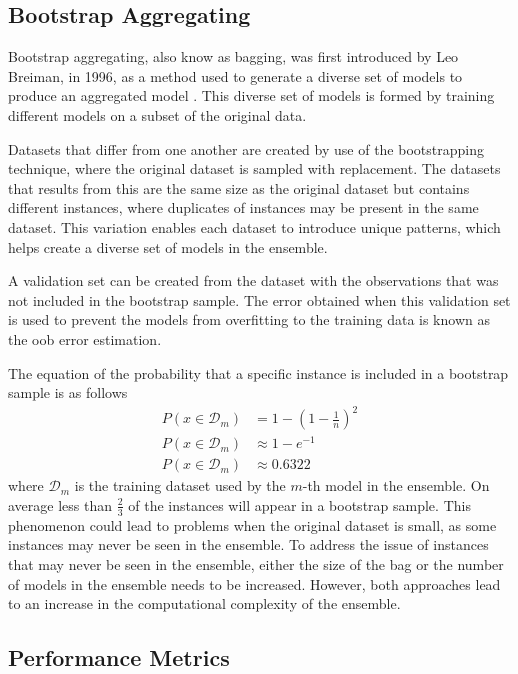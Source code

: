 \documentclass[10pt, conference]{IEEEtran}
\begin{document}
\subsection{Bootstrap Aggregating}

Bootstrap aggregating, also know as bagging, was first introduced by Leo Breiman, in 1996, as a method
used to generate a diverse set of models to produce an aggregated model \cite{Bagging_ref}. This diverse
set of models is formed by training different models on a subset of the original data.

Datasets that differ from one another are created by use of the bootstrapping technique, where
the original dataset is sampled with replacement. The datasets that results from this are the same
size as the original dataset but contains different instances, where duplicates of instances
may be present in the same dataset. This variation enables each dataset to introduce unique
patterns, which helps create a diverse set of models in the ensemble.

A validation set can be created from the dataset with the observations that was not included
in the bootstrap sample. The error obtained when this validation set is used to prevent the
models from overfitting to the training data is known as the \acrfull{oob} error estimation.

The equation of the probability that a specific instance is included in a bootstrap sample is as follows
\begin{align*}
    P(x \in \mathcal{D}_m) &= 1 - \left(1 - \frac{1}{n}\right)^2 \\
    P(x \in \mathcal{D}_m) &\approx 1 - e^{-1} \\
    P(x \in \mathcal{D}_m) &\approx 0.6322 \tag{10}
\end{align*}
where $\mathcal{D}_m$ is the training dataset used by the $m$-th model in the ensemble.
On average less than $\frac{2}{3}$ of the instances will appear in a bootstrap sample.
This phenomenon could lead to problems when the original dataset is small, as some instances
may never be seen in the ensemble. To address the issue of instances that may never be seen in the ensemble,
either the size of the bag or the number of models in the ensemble needs to be increased.
However, both approaches lead to an increase in the computational complexity of the ensemble.

\subsection{Performance Metrics} \label{section: Perf_Metrics_background}
\end{document}
